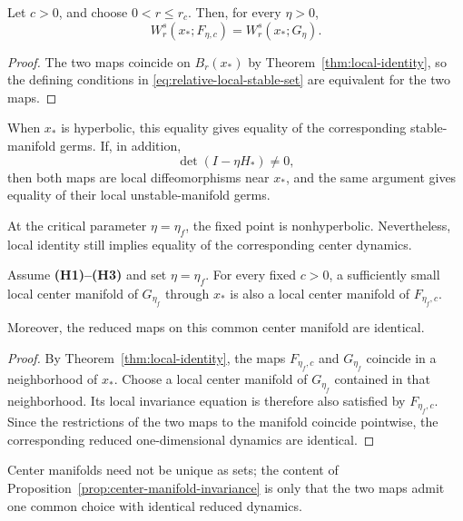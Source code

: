 \begin{proposition}
\label{prop:local-stable-dynamics}
Let $c>0$, and choose $0<r\leq r_c$.
Then, for every $\eta>0$,
\begin{equation}
W^s_r(x_*;F_{\eta,c})
=
W^s_r(x_*;G_\eta).
\label{eq:stable-set-equality}
\end{equation}
\end{proposition}

\begin{proof}
The two maps coincide on $B_r(x_*)$ by
Theorem~\ref{thm:local-identity}, so the defining conditions in
\eqref{eq:relative-local-stable-set} are equivalent for the two
maps.
\end{proof}

When $x_*$ is hyperbolic, this equality gives equality of the
corresponding stable-manifold germs.  If, in addition,
\begin{equation}
\det(I-\eta H_*)\neq0,
\label{eq:local-diffeomorphism-condition}
\end{equation}
then both maps are local diffeomorphisms near $x_*$, and the same
argument gives equality of their local unstable-manifold germs.

At the critical parameter $\eta=\eta_f$, the fixed point is
nonhyperbolic. Nevertheless, local identity still implies equality
of the corresponding center dynamics.

\begin{proposition}
\label{prop:center-manifold-invariance}
Assume \textbf{(H1)--(H3)} and set $\eta=\eta_f$.
For every fixed $c>0$, a sufficiently small local center manifold of
$G_{\eta_f}$ through $x_*$ is also a local center manifold of
$F_{\eta_f,c}$.

Moreover, the reduced maps on this common center manifold are
identical.
\end{proposition}

\begin{proof}
By Theorem~\ref{thm:local-identity}, the maps
$F_{\eta_f,c}$ and $G_{\eta_f}$ coincide in a neighborhood of
$x_*$. Choose a local center manifold of $G_{\eta_f}$ contained in
that neighborhood. Its local invariance equation is therefore also
satisfied by $F_{\eta_f,c}$. Since the restrictions of the two maps
to the manifold coincide pointwise, the corresponding reduced
one-dimensional dynamics are identical.
\end{proof}

\begin{remark}
\label{rem:center-manifold-nonuniqueness}
Center manifolds need not be unique as sets; the content of
Proposition~\ref{prop:center-manifold-invariance} is only that the
two maps admit one common choice with identical reduced dynamics.
\end{remark}

